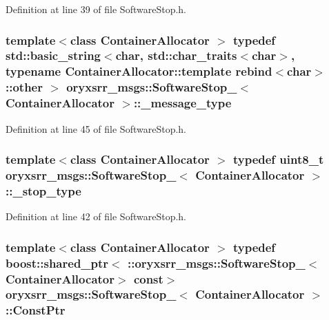 \-Definition at line 39 of file \-Software\-Stop.\-h.

\subsubsection[{\-\_\-message\-\_\-type}]{\setlength{\rightskip}{0pt plus 5cm}template$<$class Container\-Allocator $>$ typedef std\-::basic\-\_\-string$<$char, std\-::char\-\_\-traits$<$char$>$, typename \-Container\-Allocator\-::template rebind$<$char$>$\-::other $>$ {\bf oryxsrr\-\_\-msgs\-::\-Software\-Stop\-\_\-}$<$ \-Container\-Allocator $>$\-::{\bf \-\_\-message\-\_\-type}}\label{structoryxsrr__msgs_1_1SoftwareStop___a4f12621838d56566538233fe5e31a37c}


\-Definition at line 45 of file \-Software\-Stop.\-h.

\subsubsection[{\-\_\-stop\-\_\-type}]{\setlength{\rightskip}{0pt plus 5cm}template$<$class Container\-Allocator $>$ typedef uint8\-\_\-t {\bf oryxsrr\-\_\-msgs\-::\-Software\-Stop\-\_\-}$<$ \-Container\-Allocator $>$\-::{\bf \-\_\-stop\-\_\-type}}\label{structoryxsrr__msgs_1_1SoftwareStop___a27a30ac914918bcf1e144dc82ecc4606}


\-Definition at line 42 of file \-Software\-Stop.\-h.

\subsubsection[{\-Const\-Ptr}]{\setlength{\rightskip}{0pt plus 5cm}template$<$class Container\-Allocator $>$ typedef boost\-::shared\-\_\-ptr$<$ \-::{\bf oryxsrr\-\_\-msgs\-::\-Software\-Stop\-\_\-}$<$\-Container\-Allocator$>$ const$>$ {\bf oryxsrr\-\_\-msgs\-::\-Software\-Stop\-\_\-}$<$ \-Container\-Allocator $>$\-::{\bf \-Const\-Ptr}}\label{structoryxsrr__msgs_1_1SoftwareStop___aee81422c355a04aa1d15700648ffce9f}


